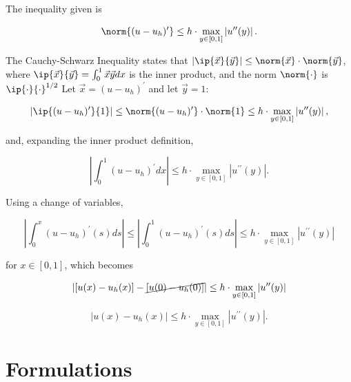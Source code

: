 \documentclass{hw-template}
\begin{document}
\subsection{} The inequality given is

\begin{equation}
    \norm{(u - u_h)^\prime} \leq h \cdot \max_{y \in [0, 1]}  \left|{u^{\prime\prime}(y)}\right|.
\end{equation}


The Cauchy-Schwarz Inequality states that $|\ip{\vec{x}}{\vec{y}}| \leq \norm{\vec{x}} \cdot \norm{\vec{y}}$, where $\ip{\vec{x}}{\vec{y}} = \int_0^1 \vec{x}\vec{y}dx$ is the inner product, and the norm $\norm{\cdot}$ is $\ip{\cdot}{\cdot}^{1/2}$ Let $\vec{x} = (u - u_h)^\prime$ and let $\vec{y} = 1$:

\begin{equation}
    |\ip{(u - u_h)^\prime}{1}| \leq \norm{(u - u_h)^\prime} \cdot \norm{1} \leq h \cdot \max_{y \in [0, 1]}  \left|{u^{\prime\prime}(y)}\right|,
\end{equation}

and, expanding the inner product definition,

\begin{equation}
    \left|\int_0^1 (u - u_h)^\prime dx \right| \leq h \cdot \max_{y \in [0, 1]}  \left|{u^{\prime\prime}(y)}\right|.
\end{equation}

Using a change of variables,

\begin{equation}
    \left|\int_0^x (u - u_h)^\prime (s) ds \right| \leq \left| \int_0^1 (u - u_h)^\prime (s) ds \right| \leq h \cdot \max_{y \in [0, 1]}  \left|{u^{\prime\prime}(y)}\right|
\end{equation}

for $x \in [0, 1]$, which becomes

\begin{equation}
     \left|\left[ u(x) - u_h(x) \right] - \cancel{\left[ u(0) - u_h(0) \right]} \right| \leq h \cdot \max_{y \in [0, 1]}  \left|{u^{\prime\prime}(y)}\right|
\end{equation}

\begin{equation}
     \left| u(x) - u_h(x) \right| \leq h \cdot \max_{y \in [0, 1]}  \left|{u^{\prime\prime}(y)}\right|.
\end{equation}

\section{Formulations}
\end{document}

